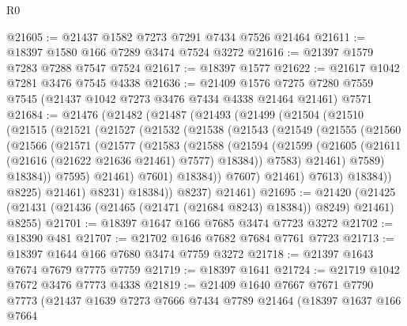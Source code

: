 \begin{lexlean}{R0}
\begin{coremodule}
@21605 := @21437 @1582 @7273 @7291 @7434 @7526 @21464
@21611 := @18397 @1580 @166 @7289 @3474 @7524 @3272
@21616 := @21397 @1579 @7283 @7288 @7547 @7524
@21617 := @18397 @1577
@21622 := @21617 @1042 @7281 @3476 @7545 @4338
@21636 := @21409
    @1576
    @7275
    @7280
    @7559
    @7545
    (@21437 @1042 @7273 @3476 @7434 @4338 @21464 @21461)
    @7571
@21684 := @21476
    (@21482
      (@21487
        (@21493
          (@21499
            (@21504
              (@21510
                (@21515
                  (@21521
                    (@21527
                      (@21532
                        (@21538
                          (@21543
                            (@21549
                              (@21555
                                (@21560
                                  (@21566
                                    (@21571
                                      (@21577
                                        (@21583
                                          (@21588
                                            (@21594
                                              (@21599
                                                (@21605
                                                  (@21611
                                                    (@21616 (@21622 @21636 @21461) @7577)
                                                    @18384))
                                                @7583)
                                              @21461)
                                            @7589)
                                          @18384))
                                      @7595)
                                    @21461)
                                  @7601)
                                @18384))
                            @7607)
                          @21461)
                        @7613)
                      @18384))
                  @8225)
                @21461)
              @8231)
            @18384))
        @8237)
      @21461)
@21695 := @21420
    (@21425 (@21431 (@21436 (@21465 (@21471 (@21684 @8243) @18384)) @8249) @21461) @8255)
@21701 := @18397 @1647 @166 @7685 @3474 @7723 @3272
@21702 := @18390 @481
@21707 := @21702 @1646 @7682 @7684 @7761 @7723
@21713 := @18397 @1644 @166 @7680 @3474 @7759 @3272
@21718 := @21397 @1643 @7674 @7679 @7775 @7759
@21719 := @18397 @1641
@21724 := @21719 @1042 @7672 @3476 @7773 @4338
@21819 := @21409
    @1640
    @7667
    @7671
    @7790
    @7773
    (@21437
      @1639
      @7273
      @7666
      @7434
      @7789
      @21464
      (@18397
        @1637
        @166
        @7664

\end{coremodule}
\end{lexlean}
